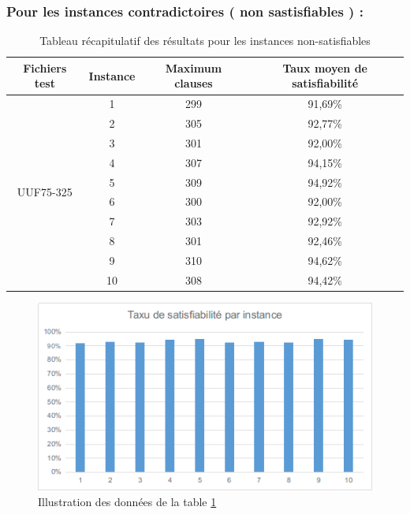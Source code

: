 \subsubsection{Pour les instances contradictoires ( non sastisfiables ) :  }
\begin{table}[H]
	\centering
	\begin{tabular}{|c|c|c|c|}
		\hline
		Fichiers test              & Instance & Maximum clauses & Taux moyen de satisfiabilité \\ \hline
		\multirow{10}{*}{UUF75-325} & 1        & 299             & 91,69\%                      \\ \cline{2-4} 
		& 2        & 305             & 92,77\%                      \\ \cline{2-4} 
		& 3        & 301             & 92,00\%                      \\ \cline{2-4} 
		& 4        & 307             & 94,15\%                      \\ \cline{2-4} 
		& 5        & 309             & 94,92\%                      \\ \cline{2-4} 
		& 6        & 300             & 92,00\%                      \\ \cline{2-4} 
		& 7        & 303             & 92,92\%                      \\ \cline{2-4} 
		& 8        & 301             & 92,46\%                      \\ \cline{2-4} 
		& 9        & 310             & 94,62\%                      \\ \cline{2-4} 
		& 10       & 308             & 94,42\%                      \\ \hline
	\end{tabular}
	\caption{Tableau récapitulatif des résultats pour les instances non-satisfiables}
	\label{table:Tab_UniformCost_Non_Sat}
\end{table}
\begin{figure}[H]
	\includegraphics[width=\textwidth]{images/UniformCostUUF75Graph.png}
	\caption{Illustration des données de la table \ref{table:Tab_UniformCost_Non_Sat}}
\end{figure}


